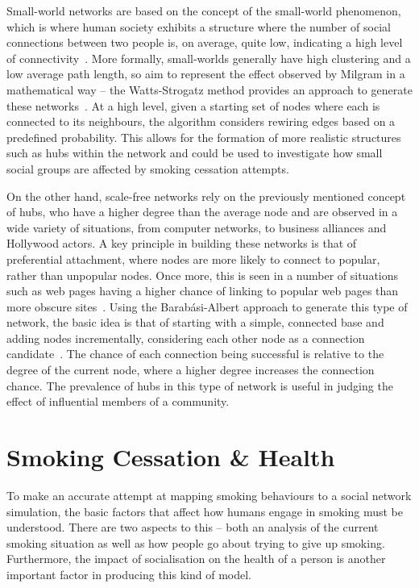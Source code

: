 \documentclass[]{report}
\begin{document}
Small-world networks are based on the concept of the small-world phenomenon, which is where human society exhibits a structure where the number of social connections between two people is, on average, quite low, indicating a high level of connectivity~\cite{milgram}. More formally, small-worlds generally have high clustering and a low average path length, so aim to represent the effect observed by Milgram in a mathematical way – the Watts-Strogatz method provides an approach to generate these networks~\cite{small-world}. At a high level, given a starting set of nodes where each is connected to its neighbours, the algorithm considers rewiring edges based on a predefined probability. This allows for the formation of more realistic structures such as hubs within the network and could be used to investigate how small social groups are affected by smoking cessation attempts.

On the other hand, scale-free networks rely on the previously mentioned concept of hubs, who have a higher degree than the average node and are observed in a wide variety of situations, from computer networks, to business alliances and Hollywood actors. A key principle in building these networks is that of preferential attachment, where nodes are more likely to connect to popular, rather than unpopular nodes. Once more, this is seen in a number of situations such as web pages having a higher chance of linking to popular web pages than more obscure sites~\cite{BA-SciAm}. Using the Barab\'{a}si-Albert approach to generate this type of network, the basic idea is that of starting with a simple, connected base and adding nodes incrementally, considering each other node as a connection candidate~\cite{BAStat}. The chance of each connection being successful is relative to the degree of the current node, where a higher degree increases the connection chance. The prevalence of hubs in this type of network is useful in judging the effect of influential members of a community.


\section{Smoking Cessation \& Health}

To make an accurate attempt at mapping smoking behaviours to a social network simulation, the basic factors that affect how humans engage in smoking must be understood. There are two aspects to this – both an analysis of the current smoking situation as well as how people go about trying to give up smoking. Furthermore, the impact of socialisation on the health of a person is another important factor in producing this kind of model.
\end{document}
